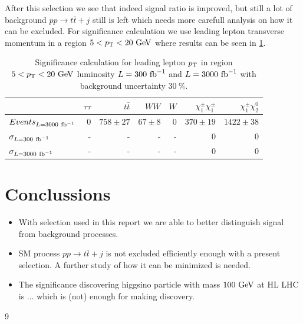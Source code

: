 \documentclass[tightenline,notitlepage,nofootinbib]{revtex4-1}
\begin{document}
After this selection we see that indeed signal ratio is improved, but still a lot of background $pp \to t \bar t + j$ still is left which needs more carefull analysis on how it can be excluded. For significance calculation we use leading lepton transverse momentum in a region $5<p_{\rm T}<20~\rm{GeV}$ where results can be seen in \cref{tab:select}.
\begin{table}[!ht]
  \setlength{\tabcolsep}{12pt}
  \centering
  \begin{tabular}{l|rrrrrr}
    & $\tau \tau$ & $t \bar t$ & $WW$ & $W$ & $\chi_1^{\pm} \chi_1^{\pm}$ &  $\chi_1^{\pm} \chi_2^0$ \\
    \hline
    $Events_{L=3000~\rm{fb}^{-1}}$  & 0 & $758 \pm 27$ & $67 \pm 8$ & 0 & $370 \pm 19$ & $1422 \pm 38$ \\
    $\sigma_{L=300~\rm{fb}^{-1}}$ & - & - & - & - & 0 & 0 \\
    $\sigma_{L=3000~\rm{fb}^{-1}}$ & - & - & - & - & 0 & 0 
  \end{tabular}
  \caption{Significance calculation for leading lepton $p_{\rm T}$ in region $5<p_{\rm T}<20~\rm{GeV}$ luminosity $L=300~\rm{fb}^{-1}$ and $L=3000~\rm{fb}^{-1}$ with background uncertainty $30~\%$.
  }
  \label{tab:select}
\end{table}

\section{Conclussions}

\begin{itemize}
\item With selection used in this report we are able to better distinguish signal from background processes.  
\item SM process $pp \to t \bar t + j$ is not excluded efficiently enough with a present selection. A further study of how it can be minimized is needed. 
\item The significance discovering higgsino particle with mass $100~\rm{GeV}$ at HL LHC is ... which is (not) enough for making discovery. 
\end{itemize}

%
{9}
%
  
\end{document}
